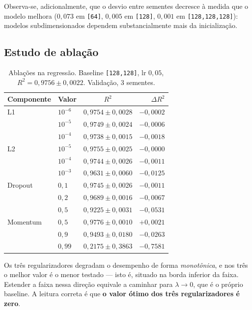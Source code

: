 \documentclass[11pt,a4paper]{article}
\begin{document}
Observa-se, adicionalmente, que o desvio entre sementes decresce à medida que o modelo
melhora ($0{,}073$ em \texttt{[64]}, $0{,}005$ em \texttt{[128]}, $0{,}001$ em
\texttt{[128,128,128]}): modelos subdimensionados dependem substancialmente mais da
inicialização.

\subsection{Estudo de ablação}

\begin{table}[htbp]
\centering
\caption{Ablações na regressão. Baseline \texttt{[128,128]}, lr $0{,}05$,
$R^2 = 0{,}9756 \pm 0{,}0022$. Validação, 3 sementes.}
\label{tab:reg-abl}
\begin{tabular}{llcr}
\toprule
Componente & Valor & $R^2$ & $\Delta R^2$ \\
\midrule
L1 & $10^{-6}$ & $0{,}9754 \pm 0{,}0028$ & $-0{,}0002$ \\
   & $10^{-5}$ & $0{,}9749 \pm 0{,}0024$ & $-0{,}0006$ \\
   & $10^{-4}$ & $0{,}9738 \pm 0{,}0015$ & $-0{,}0018$ \\
\midrule
L2 & $10^{-5}$ & $0{,}9755 \pm 0{,}0025$ & $-0{,}0000$ \\
   & $10^{-4}$ & $0{,}9744 \pm 0{,}0026$ & $-0{,}0011$ \\
   & $10^{-3}$ & $0{,}9631 \pm 0{,}0060$ & $-0{,}0125$ \\
\midrule
Dropout & $0{,}1$ & $0{,}9745 \pm 0{,}0026$ & $-0{,}0011$ \\
        & $0{,}2$ & $0{,}9689 \pm 0{,}0016$ & $-0{,}0067$ \\
        & $0{,}5$ & $0{,}9225 \pm 0{,}0031$ & $-0{,}0531$ \\
\midrule
Momentum & $0{,}5$  & $0{,}9776 \pm 0{,}0010$ & $+0{,}0021$ \\
         & $0{,}9$  & $0{,}9493 \pm 0{,}0180$ & $-0{,}0263$ \\
         & $0{,}99$ & $0{,}2175 \pm 0{,}3863$ & $-0{,}7581$ \\
\bottomrule
\end{tabular}
\end{table}

Os três regularizadores degradam o desempenho de forma \emph{monotônica}, e nos três o
melhor valor é o menor testado --- isto é, situado na borda inferior da faixa. Estender a
faixa nessa direção equivale a caminhar para $\lambda \to 0$, que é o próprio baseline.
A leitura correta é que \textbf{o valor ótimo dos três regularizadores é zero}.
\end{document}
